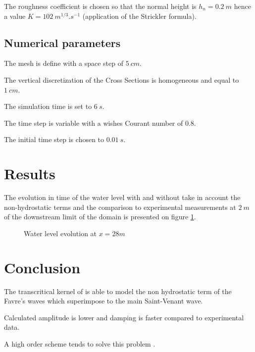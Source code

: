 The roughness coefficient is chosen so that the normal height is $h_n = 0.2\ m$ hence a value $K = 102\ m^{1/3}.s^{-1}$ (application of the Strickler formula).

\subsection{Numerical parameters}

The mesh is define with a space step of $5\ cm$.

The vertical discretization of the Cross Sections is homogeneous and equal to $1\ cm$.

The simulation time is set to $6\ s$.

The time step is variable with a wishes Courant number of $0.8$.

The initial time step is chosen to $0.01\ s$.

\section{Results}

The evolution in time of the water level with and without take in account the non-hydrostatic terms and the comparison to experimental measurements at $2\ m$ of the downstream limit of the domain is presented on figure \ref{mascaret:nonhydro:evol}.

\begin{figure}[H]
\centering
{}
\caption{Water level evolution at $x = 28 m$}
\label{mascaret:nonhydro:evol}
\end{figure}


\section{Conclusion}
The transcritical kernel of \mascaret is able to model the non hydrostatic term of the Favre's waves which superimpose to the main Saint-Venant wave.

Calculated amplitude is lower and damping is faster compared to experimental data.

A high order scheme tends to solve this problem \cite{Bristeau2011}.